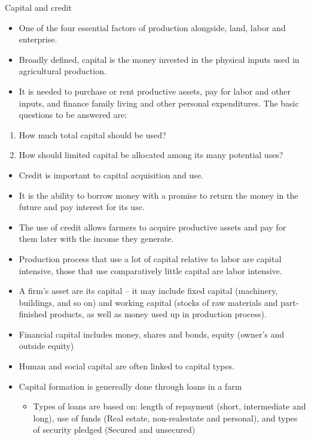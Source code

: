 \documentclass[12pt,ignorenonframetext,aspectratio=169]{beamer}
\providecommand{\tightlist}{%
  \setlength{\itemsep}{0pt}\setlength{\parskip}{0pt}}
\begin{document}
\begin{frame}{Capital and credit}
\protect\hypertarget{capital-and-credit}{}
\begin{itemize}
\tightlist
\item
  One of the four essential factors of production alongside, land, labor
  and enterprise.
\item
  Broadly defined, capital is the money invested in the physical inputs
  used in agricultural production.
\item
  It is needed to purchase or rent productive assets, pay for labor and
  other inputs, and finance family living and other personal
  expenditures. The basic questions to be answered are:
\end{itemize}

\begin{enumerate}
\tightlist
\item
  How much total capital should be used?
\item
  How should limited capital be allocated among its many potential uses?
\end{enumerate}

\begin{itemize}
\tightlist
\item
  Credit is important to capital acquisition and use.
\item
  It is the ability to borrow money with a promise to return the money
  in the future and pay interest for its use.
\item
  The use of credit allows farmers to acquire productive assets and pay
  for them later with the income they generate.
\end{itemize}
\end{frame}

\begin{frame}{}
\protect\hypertarget{section-3}{}
\begin{itemize}
\tightlist
\item
  Production process that use a lot of capital relative to labor are
  capital intensive, those that use comparatively little capital are
  labor intensive.
\item
  A firm's asset are its capital -- it may include fixed capital
  (machinery, buildings, and so on) and working capital (stocks of raw
  materials and part-finished products, as well as money used up in
  production process).
\item
  Financial capital includes money, shares and bonds, equity (owner's
  and outside equity)
\item
  Human and social capital are often linked to capital types.
\item
  Capital formation is genereally done through loans in a farm

  \begin{itemize}
  \tightlist
  \item
    Types of loans are based on: length of repayment (short,
    intermediate and long), use of funds (Real estate, non-realestate
    and personal), and types of security pledged (Secured and unsecured)
  \end{itemize}
\end{itemize}
\end{frame}
\end{document}

